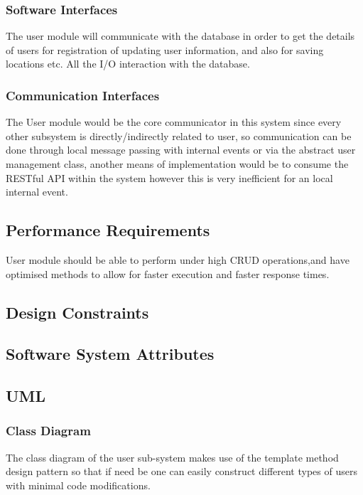 	\subsubsection{Software Interfaces } 
	The user module will communicate with the database in order to get the details of users for registration of updating user information, and also for saving locations etc. All the I/O interaction with the database.
	\subsubsection{Communication Interfaces } 

	The User module would be the core communicator in this system since every other subsystem is directly/indirectly related to user, so communication can be done through local message passing with internal events or via the abstract user management class, another means of implementation would be to consume the RESTful API within the system however this is very inefficient for an local internal event.


	
\subsection{Performance Requirements} %
User module should be able to perform under high CRUD operations,and have optimised methods to allow for faster execution and faster response times.


\subsection{Design Constraints}



\subsection{Software System Attributes} %

\subsection{UML}
\subsubsection{Class Diagram}
The class diagram of the user sub-system makes use of the template method design pattern so that if need be one can easily construct different types of users with minimal code modifications.

